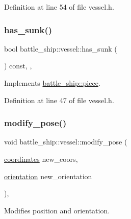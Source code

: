 Definition at line 54 of file vessel.\+h.

\mbox{\label{classbattle__ship_1_1vessel_a5f36d687fbb87ced436d2d88847a1d5c}} 
\subsubsection{\texorpdfstring{has\+\_\+sunk()}{has\_sunk()}}
{\footnotesize\ttfamily bool battle\+\_\+ship\+::vessel\+::has\+\_\+sunk (\begin{DoxyParamCaption}{ }\end{DoxyParamCaption}) const\hspace{0.3cm}{\ttfamily [inline]}, {\ttfamily [override]}, {\ttfamily [virtual]}}



Implements \hyperlink{classbattle__ship_1_1piece_af22bd781f4206decd0beed89b014d1cc}{battle\+\_\+ship\+::piece}.



Definition at line 47 of file vessel.\+h.

\mbox{\label{classbattle__ship_1_1vessel_ace0ec527147243b1fa6fa920d5a32a1f}} 
\subsubsection{\texorpdfstring{modify\+\_\+pose()}{modify\_pose()}}
{\footnotesize\ttfamily void battle\+\_\+ship\+::vessel\+::modify\+\_\+pose (\begin{DoxyParamCaption}\item[{\hyperlink{structbattle__ship_1_1coordinates}{coordinates}}]{new\+\_\+coors,  }\item[{\hyperlink{namespacebattle__ship_aed87488f0a73f0d0679fe343fb61c784}{orientation}}]{new\+\_\+orientation }\end{DoxyParamCaption})\hspace{0.3cm}{\ttfamily [override]}, {\ttfamily [virtual]}}



Modifies position and orientation. 



